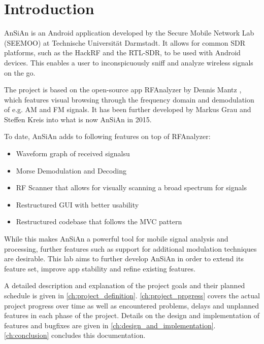 \chapter{Introduction}\label{ch:introduction}
\glsresetall %
\setcounter{table}{0} %

\ac{AnSiAn} is an Android application developed by the Secure Mobile Network Lab (SEEMOO) at 
Technische Universität Darmstadt. It allows for common \ac{SDR} platforms, such as the HackRF and the RTL-SDR, to be used with Android devices. This enables a user to inconspicuously sniff and analyze wireless signals on the go.

The project is based on the open-source app RFAnalyzer by Dennis Mantz \cite{RFAnalyzer_GitHub}, which features visual browsing through the frequency domain and demodulation of e.g. \ac{AM} and \ac{FM} signals. It has been further developed by Markus Grau and Steffen Kreis into what is now \ac{AnSiAn} in 2015.

To date, \ac{AnSiAn} adds to following features on top of RFAnalyzer:

\begin{itemize}
	\item Waveform graph of received signalsu
	\item Morse Demodulation and Decoding
	\item RF Scanner that allows for visually scanning a broad spectrum for signals
	\item Restructured \ac{GUI} with better usability
	\item Restructured codebase that follows the \ac{MVC} pattern
\end{itemize}

While this makes \ac{AnSiAn} a powerful tool for mobile signal analysis and processing, further features such as support for additional modulation techniques are desirable. This lab aims to further develop \ac{AnSiAn} in order to extend its feature set, improve app stability and refine existing features.

A detailed description  and explanation of the project goals and their planned schedule is given in \autoref{ch:project_definition}. \autoref{ch:project_progress} covers the actual project progress over time as well as encountered problems, delays and unplanned features in each phase of the project. Details on the design and implementation of features and bugfixes are given in \autoref{ch:design_and_implementation}.
\autoref{ch:conclusion} concludes this documentation.
